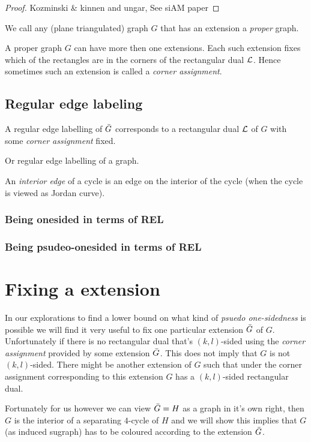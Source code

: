 \begin{proof}
Kozminski \& kinnen and ungar, See siAM paper %
\end{proof}

We call any (plane triangulated) graph $G$ that has an extension a \emph{proper} graph.

A proper graph $G$ can have more then one extensions. Each such extension fixes which of the rectangles are in the corners of the rectangular dual $\mathcal{L}$. Hence sometimes such an extension is called a \emph{corner assignment}.


\subsection{Regular edge labeling}
A regular edge labelling  of $\bar{G}$ corresponds to a rectangular dual $\mathcal{L}$ of $G$ with some \emph{corner assignment} fixed. %

Or regular edge labelling of a graph.


An \emph{interior edge} of a cycle is an edge on the interior of the cycle (when the cycle is viewed as Jordan curve).


\subsubsection{Being onesided in terms of REL}

\subsubsection{Being psudeo-onesided in terms of REL}

\section{Fixing a extension}
In our explorations to find a lower bound on what kind of \emph{psuedo one-sidedness} is possible we will find it very useful to fix one particular extension $\bar{G}$ of $G$. Unfortunately if there is no rectangular dual that’s $(k,l)$-sided using the \emph{corner assignment} provided by some extension $\bar{G}$. This does not imply that $G$ is not $(k,l)$-sided. There might be another extension of $G$ such that under the corner assignment corresponding to this extension $G$ has a $(k,l)$-sided rectangular dual. 

Fortunately for us however we can view $\bar{G} = H$ as a graph in it's own right, then $G$ is the interior of a separating $4$-cycle of $H$ and we will show this implies that $G$ (as induced sugraph) has to be coloured according to the extension $\bar{G}$. 

